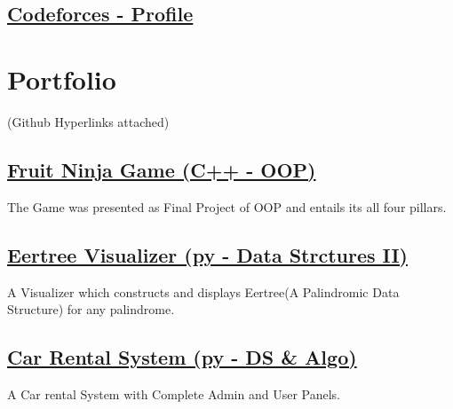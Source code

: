 \documentclass[]{m abbas resume' 2022}
\begin{document}
\begin{minipage}[t]{0.39\textwidth}
\subsection{\href{https://codeforces.com/profile/smabbasht}{\textbf{Codeforces - Profile}}}



\section{Portfolio}
    (Github Hyperlinks attached)\\

    \subsection{\href{https://github.com/smabbasht/CS224-OOP-FruitNinjaGame-cpp}{\textbf{Fruit Ninja Game (C++ - OOP)}}}%
    The Game was presented as Final Project of OOP and entails its all four pillars.

    \subsection{\href{https://github.com/smabbasht/CS201-DataSructures-II-Project-eertree}{\textbf{Eertree Visualizer (py - Data Strctures II)}}}%
    A Visualizer which constructs and displays Eertree(A Palindromic Data Structure) for any palindrome.

    \subsection{\href{https://github.com/smabbasht/HU-DSA-Project}{\textbf{Car Rental System (py - DS \& Algo)}}}%
    A Car rental System with Complete Admin and User Panels.


\end{minipage}
\end{document}

